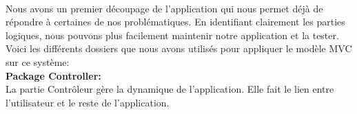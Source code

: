 \documentclass[a4paper]{report}
\begin{document}
\begin{spacing}{2}
\begin{minipage}{\linewidth}
	\label{f3}%
\end{minipage}\\
\cleardoublepage
Nous avons un premier découpage de l’application qui nous permet déjà de répondre à certaines de nos problématiques. En identifiant clairement les parties logiques, nous pouvons plus facilement maintenir notre application et la tester.\\
Voici les différents dossiers que nous avons utilisés pour appliquer le modèle MVC sur ce système:\\
\textbf{Package Controller:}\\
La partie Contrôleur gère la dynamique de l'application. Elle fait le lien entre l'utilisateur et le reste de l'application.\\
\begin{minipage}{\linewidth}

\end{minipage}
\end{spacing}
\end{document}
